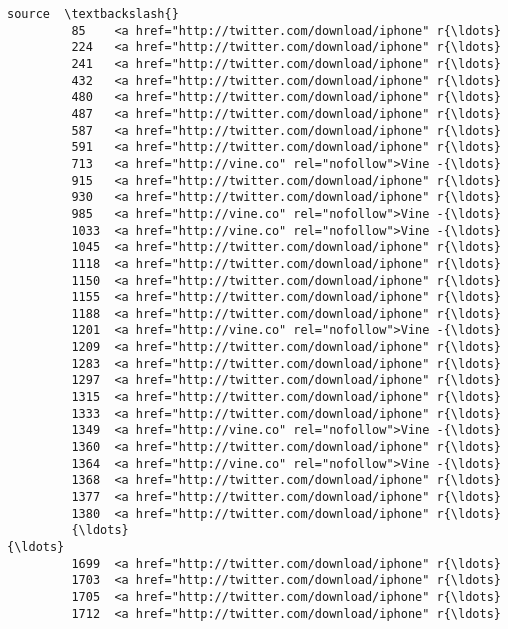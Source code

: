 \documentclass[11pt]{article}
\begin{document}
\begin{Verbatim}[commandchars=\\\{\}]
                                                          source  \textbackslash{}
         85    <a href="http://twitter.com/download/iphone" r{\ldots}   
         224   <a href="http://twitter.com/download/iphone" r{\ldots}   
         241   <a href="http://twitter.com/download/iphone" r{\ldots}   
         432   <a href="http://twitter.com/download/iphone" r{\ldots}   
         480   <a href="http://twitter.com/download/iphone" r{\ldots}   
         487   <a href="http://twitter.com/download/iphone" r{\ldots}   
         587   <a href="http://twitter.com/download/iphone" r{\ldots}   
         591   <a href="http://twitter.com/download/iphone" r{\ldots}   
         713   <a href="http://vine.co" rel="nofollow">Vine -{\ldots}   
         915   <a href="http://twitter.com/download/iphone" r{\ldots}   
         930   <a href="http://twitter.com/download/iphone" r{\ldots}   
         985   <a href="http://vine.co" rel="nofollow">Vine -{\ldots}   
         1033  <a href="http://vine.co" rel="nofollow">Vine -{\ldots}   
         1045  <a href="http://twitter.com/download/iphone" r{\ldots}   
         1118  <a href="http://twitter.com/download/iphone" r{\ldots}   
         1150  <a href="http://twitter.com/download/iphone" r{\ldots}   
         1155  <a href="http://twitter.com/download/iphone" r{\ldots}   
         1188  <a href="http://twitter.com/download/iphone" r{\ldots}   
         1201  <a href="http://vine.co" rel="nofollow">Vine -{\ldots}   
         1209  <a href="http://twitter.com/download/iphone" r{\ldots}   
         1283  <a href="http://twitter.com/download/iphone" r{\ldots}   
         1297  <a href="http://twitter.com/download/iphone" r{\ldots}   
         1315  <a href="http://twitter.com/download/iphone" r{\ldots}   
         1333  <a href="http://twitter.com/download/iphone" r{\ldots}   
         1349  <a href="http://vine.co" rel="nofollow">Vine -{\ldots}   
         1360  <a href="http://twitter.com/download/iphone" r{\ldots}   
         1364  <a href="http://vine.co" rel="nofollow">Vine -{\ldots}   
         1368  <a href="http://twitter.com/download/iphone" r{\ldots}   
         1377  <a href="http://twitter.com/download/iphone" r{\ldots}   
         1380  <a href="http://twitter.com/download/iphone" r{\ldots}   
         {\ldots}                                                 {\ldots}   
         1699  <a href="http://twitter.com/download/iphone" r{\ldots}   
         1703  <a href="http://twitter.com/download/iphone" r{\ldots}   
         1705  <a href="http://twitter.com/download/iphone" r{\ldots}   
         1712  <a href="http://twitter.com/download/iphone" r{\ldots}   

\end{Verbatim}
\end{document}
